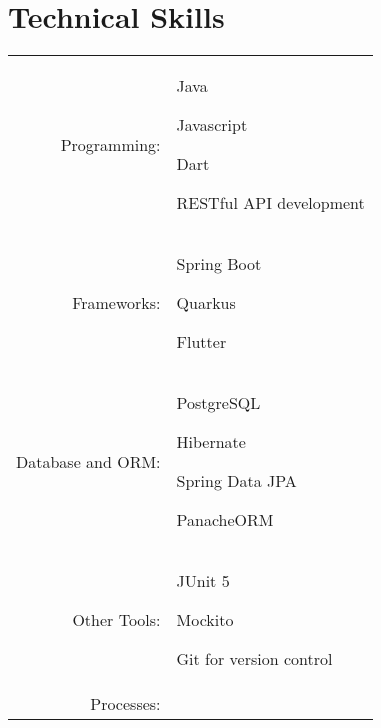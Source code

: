 \documentclass[a4paper,12pt]{article}
\begin{document}

\section{Technical Skills}
\begin{tabular}{rp{15.2cm}}
\raggedleft Programming:
& \begin{itemize*}[label=\Large\textbullet] %
    \item Java
    \item Javascript
    \item Dart
    \item RESTful API development
\end{itemize*}\\
\raggedleft Frameworks:
& \begin{itemize*}[label=\Large\textbullet]
    \item Spring Boot
    \item Quarkus
    \item Flutter
\end{itemize*}\\
\raggedleft Database and ORM:
& \begin{itemize*}[label=\Large\textbullet]
    \item PostgreSQL
    \item Hibernate
    \item Spring Data JPA
    \item PanacheORM
\end{itemize*}\\
\raggedleft Other Tools:
& \begin{itemize*}[label=\Large\textbullet]
    \item JUnit 5
    \item Mockito
    \item Git for version control
\end{itemize*}\\
\raggedleft Processes:

\end{tabular}
\end{document}
